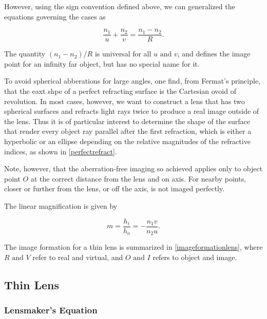 \documentclass[english,a4paper,12pt]{report}
\begin{document}
However, using the sign convention defined above, we can generalized the equations governing the cases as 

\begin{equation}
    \frac{n_1 }{u} + \frac{n_2 }{v} = \frac{n_1 - n_2 }{R}.
\end{equation}

The quantity \((n_1 -n_2 )/R\) is universal for all \(u \text { and } v\), and defines the image point for an infinity far object, but has no special name for it.   

To avoid spherical abberations for large angles, one find, from Fermat's principle, that the eaxt shpe of a perfect refracting surface is the Cartesian ovoid of revolution. In most cases, however, we want to construct a lens that has two spherical surfaces and refracts light rays twice to produce a real image outside of the lens. Thus it is of particular interest to determine the shape of the surface that render every object ray parallel after the first refraction, which is either a hyperbolic or an ellipse depending on the relative magnitudes of the refractive indices, as shown in \cref{perfectrefract}.

Note, however, that the aberration-free imaging so achieved applies only to object point \(O\) at the correct distance from the lens and on axis. For nearby points, closer or further from the lens, or off the axis, is not imaged perfectly.


The linear magnification is given by 

\begin{equation}
    m = \frac{h_{i} }{h_{o} } = -\frac{n_1 v}{n_2 u}.  
\end{equation}

The image formation for a thin lens is summarized in \cref{imageformationlens}, where \(R \text { and }  V\) refer to real and virtual, and \(O \text { and } I\) refers to object and image.

\subsection{Thin Lens}

\subsubsection{Lensmaker's Equation}
\end{document}
